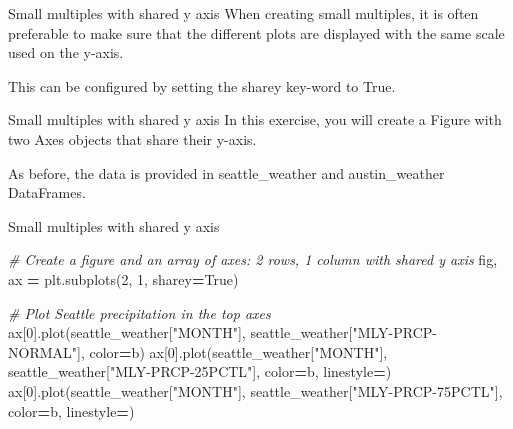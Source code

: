 \documentclass[
  ignorenonframetext,
]{beamer}
\newenvironment{Shaded}{\begin{snugshade}}{\end{snugshade}}
\newcommand{\CommentTok}[1]{\textcolor[rgb]{0.56,0.35,0.01}{\textit{#1}}}
\newcommand{\DecValTok}[1]{\textcolor[rgb]{0.00,0.00,0.81}{#1}}
\newcommand{\NormalTok}[1]{#1}
\newcommand{\OperatorTok}[1]{\textcolor[rgb]{0.81,0.36,0.00}{\textbf{#1}}}
\newcommand{\StringTok}[1]{\textcolor[rgb]{0.31,0.60,0.02}{#1}}
\newcommand{\VariableTok}[1]{\textcolor[rgb]{0.00,0.00,0.00}{#1}}
\begin{document}
\begin{frame}{Small multiples with shared y axis}
\label{small-multiples-with-shared-y-axis}
When creating small multiples, it is often preferable to make sure that
the different plots are displayed with the same scale used on the
y-axis.

This can be configured by setting the sharey key-word to True.
\end{frame}

\begin{frame}{Small multiples with shared y axis}
\label{small-multiples-with-shared-y-axis-1}
In this exercise, you will create a Figure with two Axes objects that
share their y-axis.

As before, the data is provided in seattle\_weather and austin\_weather
DataFrames.
\end{frame}

\begin{frame}[fragile]{Small multiples with shared y axis}
\label{small-multiples-with-shared-y-axis-2}

\begin{Shaded}
\begin{Highlighting}[]
\CommentTok{\# Create a figure and an array of axes: 2 rows, 1 column with shared y axis}
\NormalTok{fig, ax }\OperatorTok{=}\NormalTok{ plt.subplots(}\DecValTok{2}\NormalTok{, }\DecValTok{1}\NormalTok{, sharey}\OperatorTok{=}\VariableTok{True}\NormalTok{)}

\CommentTok{\# Plot Seattle precipitation in the top axes}
\NormalTok{ax[}\DecValTok{0}\NormalTok{].plot(seattle\_weather[}\StringTok{"MONTH"}\NormalTok{], seattle\_weather[}\StringTok{"MLY{-}PRCP{-}NORMAL"}\NormalTok{], color}\OperatorTok{=}\StringTok{\textquotesingle{}b\textquotesingle{}}\NormalTok{)}
\NormalTok{ax[}\DecValTok{0}\NormalTok{].plot(seattle\_weather[}\StringTok{"MONTH"}\NormalTok{], seattle\_weather[}\StringTok{"MLY{-}PRCP{-}25PCTL"}\NormalTok{], color}\OperatorTok{=}\StringTok{\textquotesingle{}b\textquotesingle{}}\NormalTok{, linestyle}\OperatorTok{=}\StringTok{\textquotesingle{}{-}{-}\textquotesingle{}}\NormalTok{)}
\NormalTok{ax[}\DecValTok{0}\NormalTok{].plot(seattle\_weather[}\StringTok{"MONTH"}\NormalTok{], seattle\_weather[}\StringTok{"MLY{-}PRCP{-}75PCTL"}\NormalTok{], color}\OperatorTok{=}\StringTok{\textquotesingle{}b\textquotesingle{}}\NormalTok{, linestyle}\OperatorTok{=}\StringTok{\textquotesingle{}{-}{-}\textquotesingle{}}\NormalTok{)}
\end{Highlighting}
\end{Shaded}
\end{frame}
\end{document}
